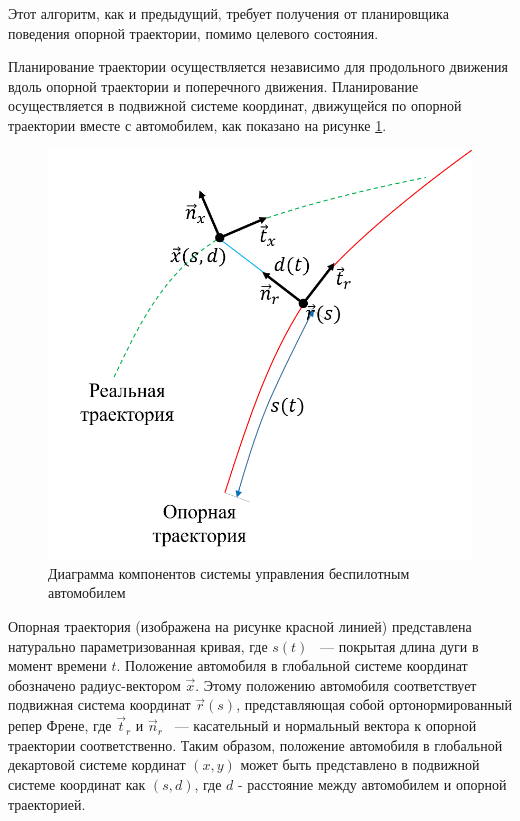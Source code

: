 Этот алгоритм, как и предыдущий, требует получения от планировщика поведения опорной траектории, помимо целевого
состояния.

Планирование траектории осуществляется независимо для продольного движения вдоль опорной траектории и поперечного
движения. Планирование осуществляется в подвижной системе координат, движущейся по опорной траектории вместе с
автомобилем, как показано на рисунке \ref{img:frenet_frame}.

\begin{figure}[h]
      \centering
      \includegraphics[]{images/frenet_frame}
      \caption{Диаграмма компонентов системы управления беспилотным автомобилем}
      \label{img:frenet_frame}
\end{figure}

Опорная траектория (изображена на рисунке красной линией) представлена натурально параметризованная кривая, где $s(t)$
~--- покрытая длина дуги в момент времени $t$. Положение автомобиля в глобальной системе координат обозначено
радиус-вектором $\vec{x}$. Этому положению автомобиля соответствует подвижная система координат $\vec{r}(s)$,
представляющая собой ортонормированный репер Френе, где $\vec{t}_r$ и $\vec{n}_r$ ~--- касательный и нормальный вектора
к опорной траектории соответственно. Таким образом, положение автомобиля в глобальной декартовой системе кординат
$(x, y)$ может быть представлено в подвижной системе координат как $(s, d)$, где $d$ - расстояние между автомобилем и
опорной траекторией.

